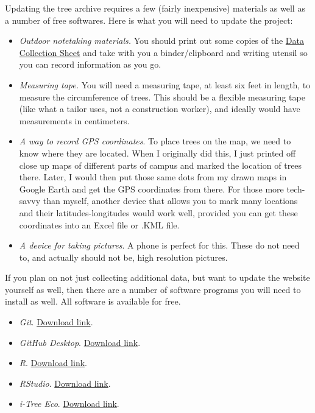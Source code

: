 \documentclass[11pt]{article}
\begin{document}
Updating the tree archive requires a few (fairly inexpensive) materials as well as a number of free softwares. Here is what you will need to update the project:
\begin{itemize}
	\item \emph{Outdoor notetaking materials.} You should print out some copies of the \href{https://github.com/CoeTreeArchive/CoeTreeArchive.github.io/raw/main/documentation/data-collection-sheet.xlsx}{Data Collection Sheet} and take with you a binder/clipboard and writing utensil so you can record information as you go. 
	\item \emph{Measuring tape.} You will need a measuring tape, at least six feet in length, to measure the circumference of trees. This should be a flexible measuring tape (like what a tailor uses, not a construction worker), and ideally would have measurements in centimeters. 
	\item \emph{A way to record GPS coordinates}. To place trees on the map, we need to know where they are located. When I originally did this, I just printed off close up maps of different parts of campus and marked the location of trees there. Later, I would then put those same dots from my drawn maps in Google Earth and get the GPS coordinates from there. For those more tech-savvy than myself, another device that allows you to mark many locations and their latitudes-longitudes would work well, provided you can get these coordinates into an Excel file or .KML file.
	\item \emph{A device for taking pictures}. A phone is perfect for this. These do not need to, and actually should not be, high resolution pictures. 
\end{itemize}
If you plan on not just collecting additional data, but want to update the website yourself as well, then there are a number of software programs you will need to install as well. All software is available for free. 
\begin{itemize}
	\item \emph{Git}. \href{https://git-scm.com/downloads}{Download link}.
	\item \emph{GitHub Desktop}. \href{https://desktop.github.com/}{Download link}.
	\item \emph{R}. \href{https://mirror.las.iastate.edu/CRAN/}{Download link}. 
	\item \emph{RStudio}. \href{https://posit.co/downloads/}{Download link}. 
	\item \emph{i-Tree Eco}.  \href{https://www.itreetools.org/i-tree-tools-download}{Download link}. 
\end{itemize}
\end{document}
